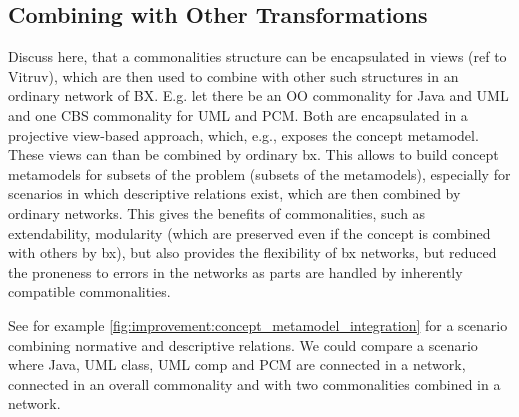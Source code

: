 

\subsection{Combining with Other Transformations}


Discuss here, that a commonalities structure can be encapsulated in views (ref to Vitruv), which are then used to combine with other such structures in an ordinary network of BX. E.g. let there be an OO commonality for Java and UML and one CBS commonality for UML and PCM. Both are encapsulated in a projective view-based approach, which, e.g., exposes the concept metamodel. These views can than be combined by ordinary bx. This allows to build concept metamodels for subsets of the problem (subsets of the metamodels), especially for scenarios in which descriptive relations exist, which are then combined by ordinary networks. This gives the benefits of commonalities, such as extendability, modularity (which are preserved even if the concept is combined with others by bx), but also provides the flexibility of bx networks, but reduced the proneness to errors in the networks as parts are handled by inherently compatible commonalities.

See for example \autoref{fig:improvement:concept_metamodel_integration} for a scenario combining normative and descriptive relations. We could compare a scenario where Java, UML class, UML comp and PCM are connected in a network, connected in an overall commonality and with two commonalities combined in a network.

